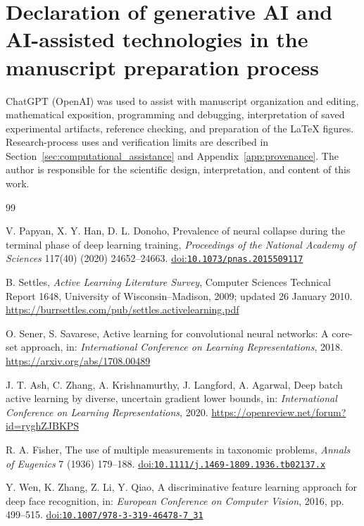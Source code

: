 \documentclass[a4paper,fleqn]{cas-dc}
\providecommand{\doi}[1]{%
  \href{https://doi.org/#1}{doi:\nolinkurl{#1}}}
\begin{document}
\FloatBarrier
\begingroup
\small


\section*{Declaration of generative AI and AI-assisted technologies
in the manuscript preparation process}
ChatGPT (OpenAI) was used to assist with manuscript organization and
editing, mathematical exposition, programming and debugging,
interpretation of saved experimental artifacts, reference checking,
and preparation of the LaTeX figures. Research-process uses and
verification limits are described in Section~\ref{sec:computational_assistance}
and Appendix~\ref{app:provenance}.
The author is responsible for the scientific design, interpretation,
and content of this work.

\begin{thebibliography}{99}

V. Papyan, X. Y. Han, D. L. Donoho,
Prevalence of neural collapse during the terminal phase of
deep learning training,
\emph{Proceedings of the National Academy of Sciences}
117(40) (2020) 24652--24663.
\doi{10.1073/pnas.2015509117}


B. Settles,
\emph{Active Learning Literature Survey},
Computer Sciences Technical Report 1648,
University of Wisconsin--Madison, 2009; updated 26 January 2010.
\url{https://burrsettles.com/pub/settles.activelearning.pdf}


O. Sener, S. Savarese,
Active learning for convolutional neural networks:
A core-set approach,
in: \emph{International Conference on Learning Representations}, 2018.
\url{https://arxiv.org/abs/1708.00489}


J. T. Ash, C. Zhang, A. Krishnamurthy, J. Langford, A. Agarwal,
Deep batch active learning by diverse, uncertain gradient lower bounds,
in: \emph{International Conference on Learning Representations}, 2020.
\url{https://openreview.net/forum?id=ryghZJBKPS}


R. A. Fisher,
The use of multiple measurements in taxonomic problems,
\emph{Annals of Eugenics} 7 (1936) 179--188.
\doi{10.1111/j.1469-1809.1936.tb02137.x}


Y. Wen, K. Zhang, Z. Li, Y. Qiao,
A discriminative feature learning approach for deep face recognition,
in: \emph{European Conference on Computer Vision}, 2016, pp. 499--515.
\doi{10.1007/978-3-319-46478-7_31}



\end{thebibliography}
\end{document}
